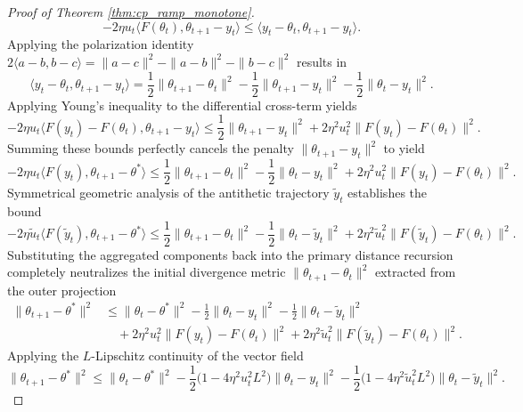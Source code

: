 \documentclass[letter,11pt]{article}
\begin{document}
\begin{proof}[Proof of Theorem \ref{thm:cp_ramp_monotone}]
\begin{equation}
-2\eta u_t \langle F(\theta_t), \theta_{t+1} - y_t \rangle \le \langle y_t - \theta_t, \theta_{t+1} - y_t \rangle.
\end{equation}
Applying the polarization identity $2\langle a-b, b-c \rangle = \|a-c\|^2 - \|a-b\|^2 - \|b-c\|^2$ results in
\begin{equation}
\langle y_t - \theta_t, \theta_{t+1} - y_t \rangle = \frac{1}{2}\|\theta_{t+1} - \theta_t\|^2 - \frac{1}{2}\|\theta_{t+1} - y_t\|^2 - \frac{1}{2}\|\theta_t - y_t\|^2.
\end{equation}
Applying Young's inequality to the differential cross-term yields
\begin{equation}
-2\eta u_t \langle F(y_t) - F(\theta_t), \theta_{t+1} - y_t \rangle \le \frac{1}{2}\|\theta_{t+1} - y_t\|^2 + 2\eta^2 u_t^2 \|F(y_t) - F(\theta_t)\|^2.
\end{equation}
Summing these bounds perfectly cancels the penalty $\|\theta_{t+1} - y_t\|^2$ to yield
\begin{equation}
-2\eta u_t \langle F(y_t), \theta_{t+1} - \theta^* \rangle \le \frac{1}{2}\|\theta_{t+1} - \theta_t\|^2 - \frac{1}{2}\|\theta_t - y_t\|^2 + 2\eta^2 u_t^2 \|F(y_t) - F(\theta_t)\|^2.
\end{equation}
Symmetrical geometric analysis of the antithetic trajectory $\tilde{y}_t$ establishes the bound
\begin{equation}
-2\eta \tilde{u}_t \langle F(\tilde{y}_t), \theta_{t+1} - \theta^* \rangle \le \frac{1}{2}\|\theta_{t+1} - \theta_t\|^2 - \frac{1}{2}\|\theta_t - \tilde{y}_t\|^2 + 2\eta^2 \tilde{u}_t^2 \|F(\tilde{y}_t) - F(\theta_t)\|^2.
\end{equation}
Substituting the aggregated components back into the primary distance recursion completely neutralizes the initial divergence metric $\|\theta_{t+1} - \theta_t\|^2$ extracted from the outer projection
\begin{equation} \label{eq:cp_ramp_aggregated}
\begin{aligned}
\|\theta_{t+1} - \theta^*\|^2 &\le \|\theta_t - \theta^*\|^2 - \frac{1}{2}\|\theta_t - y_t\|^2 - \frac{1}{2}\|\theta_t - \tilde{y}_t\|^2 \\
&\quad + 2\eta^2 u_t^2 \|F(y_t) - F(\theta_t)\|^2 + 2\eta^2 \tilde{u}_t^2 \|F(\tilde{y}_t) - F(\theta_t)\|^2.
\end{aligned}
\end{equation}
Applying the $L$-Lipschitz continuity of the vector field
\begin{equation}
\|\theta_{t+1} - \theta^*\|^2 \le \|\theta_t - \theta^*\|^2 - \frac{1}{2} \big( 1 - 4\eta^2 u_t^2 L^2 \big) \|\theta_t - y_t\|^2 - \frac{1}{2} \big( 1 - 4\eta^2 \tilde{u}_t^2 L^2 \big) \|\theta_t - \tilde{y}_t\|^2.

\end{equation}
\end{proof}
\end{document}
